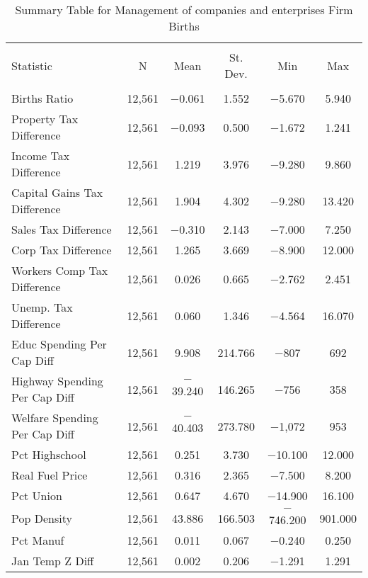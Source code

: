 
\begin{table}[!htbp] \centering 
  \caption{Summary Table for  Management of companies and enterprises Firm Births} 
  \label{55summary} 
\begin{tabular}{@{\extracolsep{5pt}}lccccc} 
\\[-1.8ex]\hline 
\hline \\[-1.8ex] 
Statistic & \multicolumn{1}{c}{N} & \multicolumn{1}{c}{Mean} & \multicolumn{1}{c}{St. Dev.} & \multicolumn{1}{c}{Min} & \multicolumn{1}{c}{Max} \\ 
\hline \\[-1.8ex] 
Births Ratio & 12,561 & $-$0.061 & 1.552 & $-$5.670 & 5.940 \\ 
Property Tax Difference & 12,561 & $-$0.093 & 0.500 & $-$1.672 & 1.241 \\ 
Income Tax Difference & 12,561 & 1.219 & 3.976 & $-$9.280 & 9.860 \\ 
Capital Gains Tax Difference & 12,561 & 1.904 & 4.302 & $-$9.280 & 13.420 \\ 
Sales Tax Difference & 12,561 & $-$0.310 & 2.143 & $-$7.000 & 7.250 \\ 
Corp Tax Difference & 12,561 & 1.265 & 3.669 & $-$8.900 & 12.000 \\ 
Workers Comp Tax Difference & 12,561 & 0.026 & 0.665 & $-$2.762 & 2.451 \\ 
Unemp. Tax Difference & 12,561 & 0.060 & 1.346 & $-$4.564 & 16.070 \\ 
Educ Spending Per Cap Diff & 12,561 & 9.908 & 214.766 & $-$807 & 692 \\ 
Highway Spending Per Cap Diff & 12,561 & $-$39.240 & 146.265 & $-$756 & 358 \\ 
Welfare Spending Per Cap Diff & 12,561 & $-$40.403 & 273.780 & $-$1,072 & 953 \\ 
Pct Highschool & 12,561 & 0.251 & 3.730 & $-$10.100 & 12.000 \\ 
Real Fuel Price & 12,561 & 0.316 & 2.365 & $-$7.500 & 8.200 \\ 
Pct Union & 12,561 & 0.647 & 4.670 & $-$14.900 & 16.100 \\ 
Pop Density & 12,561 & 43.886 & 166.503 & $-$746.200 & 901.000 \\ 
Pct Manuf & 12,561 & 0.011 & 0.067 & $-$0.240 & 0.250 \\ 
Jan Temp Z Diff & 12,561 & 0.002 & 0.206 & $-$1.291 & 1.291 \\ 

\end{tabular}
\end{table}
